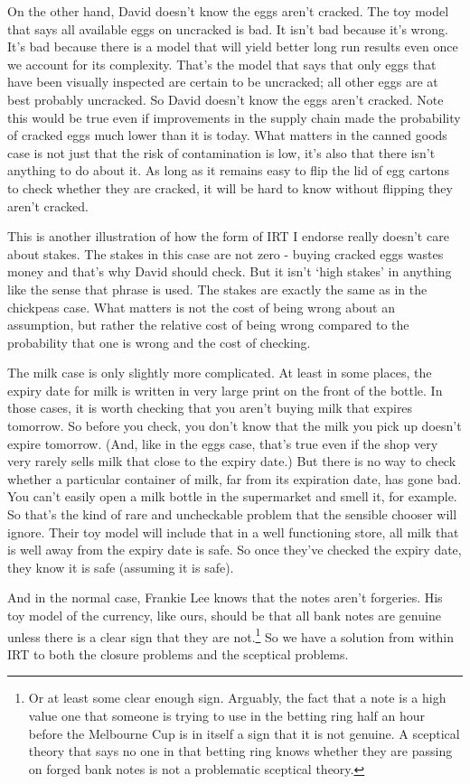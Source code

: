 \documentclass[
  10pt,
  letterpaper,
  twoside]{scrbook}
\begin{document}
On the other hand, David doesn't know the eggs aren't cracked. The toy
model that says all available eggs on uncracked is bad. It isn't bad
because it's wrong. It's bad because there is a model that will yield
better long run results even once we account for its complexity. That's
the model that says that only eggs that have been visually inspected are
certain to be uncracked; all other eggs are at best probably uncracked.
So David doesn't know the eggs aren't cracked. Note this would be true
even if improvements in the supply chain made the probability of cracked
eggs much lower than it is today. What matters in the canned goods case
is not just that the risk of contamination is low, it's also that there
isn't anything to do about it. As long as it remains easy to flip the
lid of egg cartons to check whether they are cracked, it will be hard to
know without flipping they aren't cracked.

This is another illustration of how the form of IRT I endorse really
doesn't care about stakes. The stakes in this case are not zero - buying
cracked eggs wastes money and that's why David should check. But it
isn't `high stakes' in anything like the sense that phrase is used. The
stakes are exactly the same as in the chickpeas case. What matters is
not the cost of being wrong about an assumption, but rather the relative
cost of being wrong compared to the probability that one is wrong and
the cost of checking.

The milk case is only slightly more complicated. At least in some
places, the expiry date for milk is written in very large print on the
front of the bottle. In those cases, it is worth checking that you
aren't buying milk that expires tomorrow. So before you check, you don't
know that the milk you pick up doesn't expire tomorrow. (And, like in
the eggs case, that's true even if the shop very very rarely sells milk
that close to the expiry date.) But there is no way to check whether a
particular container of milk, far from its expiration date, has gone
bad. You can't easily open a milk bottle in the supermarket and smell
it, for example. So that's the kind of rare and uncheckable problem that
the sensible chooser will ignore. Their toy model will include that in a
well functioning store, all milk that is well away from the expiry date
is safe. So once they've checked the expiry date, they know it is safe
(assuming it is safe).

And in the normal case, Frankie Lee knows that the notes aren't
forgeries. His toy model of the currency, like ours, should be that all
bank notes are genuine unless there is a clear sign that they are
not.\footnote{Or at least some clear enough sign. Arguably, the fact
  that a note is a high value one that someone is trying to use in the
  betting ring half an hour before the Melbourne Cup is in itself a sign
  that it is not genuine. A sceptical theory that says no one in that
  betting ring knows whether they are passing on forged bank notes is
  not a problematic sceptical theory.} So we have a solution from within
IRT to both the closure problems and the sceptical problems.
\end{document}
